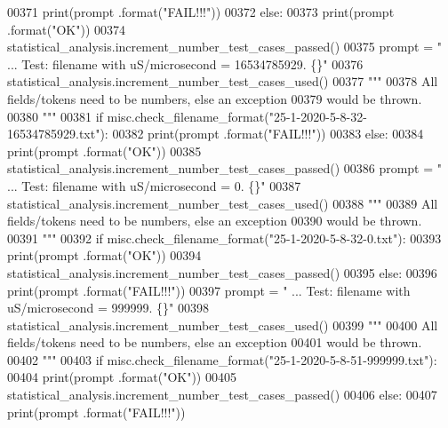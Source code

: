 \begin{DoxyCode}
00371             print(prompt .format(\textcolor{stringliteral}{"FAIL!!!"}))
00372         \textcolor{keywordflow}{else}:
00373             print(prompt .format(\textcolor{stringliteral}{"OK"}))
00374             statistical\_analysis.increment\_number\_test\_cases\_passed()
00375         prompt = \textcolor{stringliteral}{"  ... Test: filename with uS/microsecond = 16534785929.   \{\}"}
00376         statistical\_analysis.increment\_number\_test\_cases\_used()
00377         \textcolor{stringliteral}{"""}
00378 \textcolor{stringliteral}{            All fields/tokens need to be numbers, else an exception}
00379 \textcolor{stringliteral}{                would be thrown.}
00380 \textcolor{stringliteral}{        """}
00381         \textcolor{keywordflow}{if} misc.check\_filename\_format(\textcolor{stringliteral}{"25-1-2020-5-8-32-16534785929.txt"}):
00382             print(prompt .format(\textcolor{stringliteral}{"FAIL!!!"}))
00383         \textcolor{keywordflow}{else}:
00384             print(prompt .format(\textcolor{stringliteral}{"OK"}))
00385             statistical\_analysis.increment\_number\_test\_cases\_passed()
00386         prompt = \textcolor{stringliteral}{"  ... Test: filename with uS/microsecond = 0.     \{\}"}
00387         statistical\_analysis.increment\_number\_test\_cases\_used()
00388         \textcolor{stringliteral}{"""}
00389 \textcolor{stringliteral}{            All fields/tokens need to be numbers, else an exception}
00390 \textcolor{stringliteral}{                would be thrown.}
00391 \textcolor{stringliteral}{        """}
00392         \textcolor{keywordflow}{if} misc.check\_filename\_format(\textcolor{stringliteral}{"25-1-2020-5-8-32-0.txt"}):
00393             print(prompt .format(\textcolor{stringliteral}{"OK"}))
00394             statistical\_analysis.increment\_number\_test\_cases\_passed()
00395         \textcolor{keywordflow}{else}:
00396             print(prompt .format(\textcolor{stringliteral}{"FAIL!!!"}))
00397         prompt = \textcolor{stringliteral}{"  ... Test: filename with uS/microsecond = 999999.    \{\}"}
00398         statistical\_analysis.increment\_number\_test\_cases\_used()
00399         \textcolor{stringliteral}{"""}
00400 \textcolor{stringliteral}{            All fields/tokens need to be numbers, else an exception}
00401 \textcolor{stringliteral}{                would be thrown.}
00402 \textcolor{stringliteral}{        """}
00403         \textcolor{keywordflow}{if} misc.check\_filename\_format(\textcolor{stringliteral}{"25-1-2020-5-8-51-999999.txt"}):
00404             print(prompt .format(\textcolor{stringliteral}{"OK"}))
00405             statistical\_analysis.increment\_number\_test\_cases\_passed()
00406         \textcolor{keywordflow}{else}:
00407             print(prompt .format(\textcolor{stringliteral}{"FAIL!!!"}))
\end{DoxyCode}

